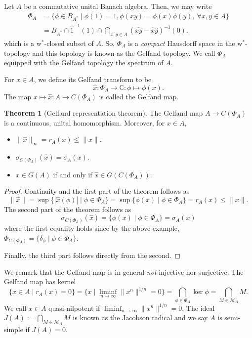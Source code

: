 \documentclass[]{article}
\theoremstyle{definition}
\newtheorem{theorem}{Theorem}
\begin{document}
Let \(A\) be a commutative unital Banach algebra. Then, we may write 
\begin{align*}
  \Phi_A & = \{\phi \in B_{A^*} \mid \phi(1) = 1, \phi(xy) = \phi(x)\phi(y),\ \forall x, y \in A\}\\
    & = B_{A^*} \cap \hat{1}^{-1}(1) \cap \bigcap_{x, y \in A} (\hat{xy} - \hat{x} \hat{y})^{-1}(0).
\end{align*}
which is a w\(^*\)-closed subset of \(A\). So, \(\Phi_A\) is a \textit{compact} Hausdorff space in the w\(^*\)-topology
and this topology is known as the Gelfand topology. We call \(\Phi_A\) equipped with the Gelfand 
topology the spectrum of \(A\).

For \(x \in A\), we define its Gelfand transform to be 
\[\hat x : \Phi_A \to \mathbb{C} : \phi \mapsto \phi(x).\]
The map \(x \mapsto \hat x : A \to C(\Phi_A)\) is called the Gelfand map. 

\begin{theorem}[Gelfand representation theorem]
  The Gelfand map \(A \to C(\Phi_A)\) is a continuous, unital homomorphism. Moreover, for \(x \in A\), 
  \begin{itemize}
    \item \(\|\hat x\|_\infty = r_A(x) \le \|x\|\).
    \item \(\sigma_{C(\Phi_A)}(\hat x) = \sigma_A(x)\).
    \item \(x \in G(A)\) if and only if \(\hat x \in G(C(\Phi_A))\).
  \end{itemize}
\end{theorem}
\begin{proof}
  Continuity and the first part of the theorem follows as 
  \[\|\hat x\| = \sup \{|\hat x(\phi)| \mid \phi \in \Phi_A\} = \sup \{\phi(x) \mid \phi \in \Phi_A\} = r_A(x) \le \|x\|.\]
  The second part of the theorem follows as
  \[\sigma_{C(\Phi_A)}(\hat x) = \{\phi(x) \mid \phi \in \Phi_A\} = \sigma_A(x)\]
  where the first equality holds since by the above example, \(\Phi_{C(\Phi_A)} = \{\delta_\phi \mid \phi \in \Phi_A\}\).

  Finally, the third part follows directly from the second.
\end{proof}

We remark that the Gelfand map is in general \textit{not} injective nor surjective. The Gelfand map has 
kernel 
\[\{x \in A \mid r_A(x) = 0\} = \{x \mid \liminf_{n \to \infty} \|x^n\|^{1 / n} = 0\} 
  = \bigcap_{\phi \in \Phi_A} \ker \phi = \bigcap_{M \in \mathcal{M}_A} M.\] 
We call \(x \in A\) quasi-nilpotent if \(\liminf_{n \to \infty} \|x^n\|^{1 / n} = 0\). 
The ideal \(J(A) := \bigcap_{M \in \mathcal{M}_A} M\) is known as the Jacobson radical and we say 
\(A\) is semi-simple if \(J(A) = 0\).
\end{document}
